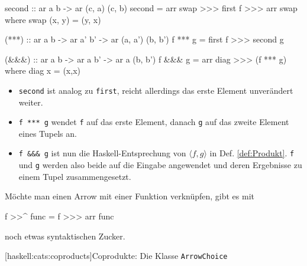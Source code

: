 \documentclass[11pt, a4paper, bibgerm]{scrbook}
\newcommand\icode[1]{\lstinline?#1?}
\newcommand\lsubsection{}
\newcommand{\dref}[1]{Def. \ref{def:#1}}
\begin{document}
\begin{code}
  second :: ar a b -> ar (c, a) (c, b)
  second = arr swap >>> first f >>> arr swap
    where swap (x, y) = (y, x)

  (***) :: ar a b -> ar a' b' -> ar (a, a') (b, b')
  f *** g = first f >>> second g

  (&&&) :: ar a b -> ar a b' -> ar a (b, b')
  f &&& g = arr diag >>> (f *** g)
    where diag x = (x,x)
\end{code} %

\begin{itemize}
\item \icode{second} ist analog zu \icode{first}, reicht allerdings das erste
Element unverändert weiter.
\item \icode{f *** g} wendet \icode{f} auf das
erste Element, danach \icode{g} auf das zweite Element eines Tupels
an.
\item \icode{f &&& g} ist nun die Haskell-Entsprechung von $\langle f,g
\rangle$ in \dref{Produkt}. \icode{f} und \icode{g} werden also beide
auf die Eingabe angewendet und deren Ergebnisse zu einem Tupel
zusammengesetzt.
\end{itemize}

Möchte man einen Arrow mit einer Funktion verknüpfen, gibt es mit
\begin{code}
f >>^ func = f >>> arr func
\end{code}%
noch etwas syntaktischen Zucker.

\lsubsection[haskell:cats:coproducts]{Coprodukte: Die Klasse \texttt{ArrowChoice}}
\end{document}
